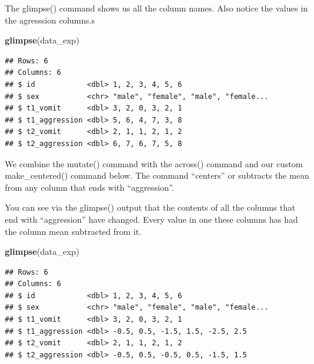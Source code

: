 \documentclass[
]{krantz}
\makeatletter
\newenvironment{Shaded}{\begin{snugshade}}{\end{snugshade}}
\newcommand{\DataTypeTok}[1]{\textcolor[rgb]{0.27,0.27,0.27}{#1}}
\newcommand{\KeywordTok}[1]{\textcolor[rgb]{0.27,0.27,0.27}{\textbf{#1}}}
\newcommand{\NormalTok}[1]{#1}
\newcommand{\OperatorTok}[1]{\textcolor[rgb]{0.43,0.43,0.43}{\textbf{#1}}}
\newcommand{\StringTok}[1]{\textcolor[rgb]{0.5,0.5,0.5}{#1}}
\newenvironment{kframe}{%
\medskip{}
\setlength{\fboxsep}{.8em}
 \def\at@end@of@kframe{}%
 \ifinner\ifhmode%
  \def\at@end@of@kframe{\end{minipage}}%
  \begin{minipage}{\columnwidth}%
 \fi\fi%
 \def\FrameCommand##1{\hskip\@totalleftmargin \hskip-\fboxsep
 \colorbox{shadecolor}{##1}\hskip-\fboxsep
     \hskip-\linewidth \hskip-\@totalleftmargin \hskip\columnwidth}%
 \MakeFramed {\advance\hsize-\width
   \@totalleftmargin\z@ \linewidth\hsize
   \@setminipage}}%
 {\par\unskip\endMakeFramed%
 \at@end@of@kframe}
\renewenvironment{Shaded}{\begin{kframe}}{\end{kframe}}
\makeatother
\begin{document}
The glimpse() command shows us all the column names. Also notice the values in the agresssion columns.s

\begin{Shaded}
\begin{Highlighting}[]
\KeywordTok{glimpse}\NormalTok{(data_exp)}
\end{Highlighting}
\end{Shaded}

\begin{verbatim}
## Rows: 6
## Columns: 6
## $ id            <dbl> 1, 2, 3, 4, 5, 6
## $ sex           <chr> "male", "female", "male", "female...
## $ t1_vomit      <dbl> 3, 2, 0, 3, 2, 1
## $ t1_aggression <dbl> 5, 6, 4, 7, 3, 8
## $ t2_vomit      <dbl> 2, 1, 1, 2, 1, 2
## $ t2_aggression <dbl> 6, 7, 6, 7, 5, 8
\end{verbatim}

We combine the mutate() command with the across() command and our custom make\_centered() command below. The command ``centers'' or subtracts the mean from any column that ends with ``aggression''.

\begin{Shaded}
\end{Shaded}

You can see via the glimpse() output that the contents of all the columns that end with ``aggression'' have changed. Every value in one these columns has had the column mean subtracted from it.

\begin{Shaded}
\begin{Highlighting}[]
\KeywordTok{glimpse}\NormalTok{(data_exp)}
\end{Highlighting}
\end{Shaded}

\begin{verbatim}
## Rows: 6
## Columns: 6
## $ id            <dbl> 1, 2, 3, 4, 5, 6
## $ sex           <chr> "male", "female", "male", "female...
## $ t1_vomit      <dbl> 3, 2, 0, 3, 2, 1
## $ t1_aggression <dbl> -0.5, 0.5, -1.5, 1.5, -2.5, 2.5
## $ t2_vomit      <dbl> 2, 1, 1, 2, 1, 2
## $ t2_aggression <dbl> -0.5, 0.5, -0.5, 0.5, -1.5, 1.5
\end{verbatim}
\end{document}

